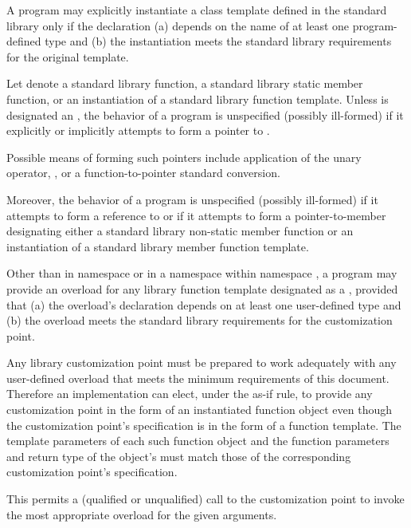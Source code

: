 \pnum
A program may explicitly instantiate
a class template defined in the standard library
only if the declaration
(a) depends on the name of at least one program-defined type
and
(b) the instantiation meets the standard library requirements for the
original template.

\pnum
Let  denote
a standard library function,
a standard library static member function,
or an instantiation
of a standard library function template.
Unless  is designated
an ,
the behavior of a \Cpp{} program is unspecified (possibly ill-formed)
if it explicitly or implicitly attempts
to form a pointer
to .
\begin{note}
Possible means of forming such pointers include
application of the unary \tcode{\&} operator,
,
or
a function-to-pointer standard conversion.
\end{note}
Moreover,
the behavior of a \Cpp{} program is unspecified (possibly ill-formed)
if it attempts to form a reference
to 
or
if it attempts to form a pointer-to-member designating
either a standard library non-static member function
or an instantiation of a standard library member function template.

\pnum
Other than in namespace 
or in a namespace
within namespace ,
a program may provide
an overload for any library function template
designated as a ,
provided that
(a)
the overload's declaration depends
on at least one user-defined type
and
(b)
the overload meets the standard library requirements
for the customization point.
\begin{footnote}
Any library customization point
must be prepared
to work adequately
with any user-defined overload
that meets the minimum requirements
of this document.
Therefore
an implementation can elect,
under the as-if rule,
to provide any customization point
in the form
of an instantiated function object
even though the customization point's specification
is in the form
of a function template.
The template parameters
of each such function object
and the function parameters
and return type
of the object's 
must match those
of the corresponding customization point's specification.
\end{footnote}
\begin{note}
This permits
a (qualified or unqualified) call
to the customization point
to invoke the most appropriate overload
for the given arguments.
\end{note}

